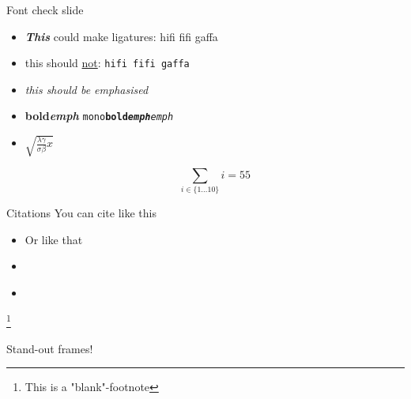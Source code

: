 \documentclass[aspectratio=169]{beamer}
\newcommand\blfootnote[1]{%
  \begingroup
  \renewcommand\thefootnote{}\footnote{#1}%
  \addtocounter{footnote}{-1}%
  \endgroup
}
\newcommand\forward[1]{\textcolor{sntpurple}{{\textbf{\textit{#1}}}}}
\begin{document}
\begin{frame}{Font check slide}
\begin{itemize}
\item \forward{This} could make ligatures: hifi fifi gaffa
\item this should \underline{not}: \texttt{hifi fifi gaffa}
\item \emph{this should be emphasised}
\item \textbf{bold\emph{emph}} \texttt{mono\textbf{bold\emph{emph}}\emph{emph}}
\item \(\sqrt{\frac{\lambda\gamma}{\sigma\beta}x}\)

\[ \sum_{i\in\{1\dots 10\}} i = 55 \]
\end{itemize}
\end{frame}

\begin{frame}{Citations}
You can cite \citep{Burt1983TheLP} like this
\begin{itemize}
    \item Or like that
    \item \cite{Ma2018InfraredAV}
    \item \citet{Burt1983TheLP}
\end{itemize}
\blfootnote{This is a "blank"-footnote}
\end{frame}

\begin{frame}[standout]
Stand-out frames!
\vfill
{}
\end{frame}
\end{document}

